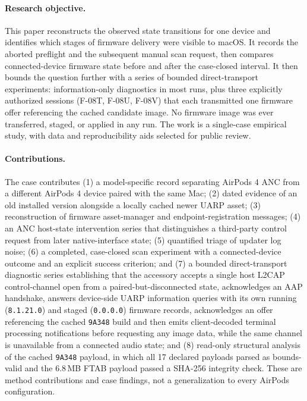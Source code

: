 \documentclass[11pt,letterpaper]{article}
\begin{document}
\paragraph{Research objective.} This paper reconstructs the observed state transitions for one device and identifies which stages of firmware delivery were visible to macOS. It records the aborted preflight and the subsequent manual scan request, then compares connected-device firmware state before and after the case-closed interval. It then bounds the question further with a series of bounded direct-transport experiments: information-only diagnostics in most runs, plus three explicitly authorized sessions (F-08T, F-08U, F-08V) that each transmitted one firmware offer referencing the cached candidate image. No firmware image was ever transferred, staged, or applied in any run. The work is a single-case empirical study, with data and reproducibility aids selected for public review.

\paragraph{Contributions.} The case contributes (1) a model-specific record separating AirPods 4 ANC from a different AirPods 4 device paired with the same Mac; (2) dated evidence of an old installed version alongside a locally cached newer UARP asset; (3) reconstruction of firmware asset-manager and endpoint-registration messages; (4) an ANC host-state intervention series that distinguishes a third-party control request from later native-interface state; (5) quantified triage of updater log noise; (6) a completed, case-closed scan experiment with a connected-device outcome and an explicit success criterion; and (7) a bounded direct-transport diagnostic series establishing that the accessory accepts a single host L2CAP control-channel open from a paired-but-disconnected state, acknowledges an AAP handshake, answers device-side UARP information queries with its own running (\texttt{8.1.21.0}) and staged (\texttt{0.0.0.0}) firmware records, acknowledges an offer referencing the cached \texttt{9A348} build and then emits client-decoded terminal processing notifications before requesting any image data, while the same channel is unavailable from a connected audio state; and (8) read-only structural analysis of the cached \texttt{9A348} payload, in which all 17 declared payloads parsed as bounds-valid and the 6.8\,MB FTAB payload passed a SHA-256 integrity check. These are method contributions and case findings, not a generalization to every AirPods configuration.
\end{document}
